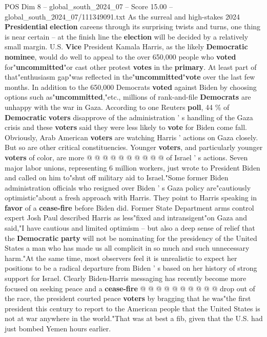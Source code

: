 \begin{textsample}{POS Dim 8 – global\_south\_2024\_07 – Score 15.00 – global\_south\_2024\_07/111349091.txt}  \label{ex:f8_pos_101}
As the surreal and high-stakes 2024 \textbf{Presidential} \textbf{election} careens through its surprising twists and turns, one thing is near certain -- at the finish line the \textbf{election} will be decided by a relatively small margin.
U.S. \textbf{Vice} President Kamala Harris, as the likely \textbf{Democratic} \textbf{nominee}, would do well to appeal to the over 650,000 people who \textbf{voted} for"\textbf{uncommitted}"or cast other protest \textbf{votes} in the \textbf{primary}.
At least part of that"enthusiasm gap"was reflected in the"\textbf{uncommitted}"\textbf{vote} over the last few months.
In addition to the 650,000 Democrats \textbf{voted} against Biden by choosing options such as"\textbf{uncommitted},"etc., millions of rank-and-file \textbf{Democrats} are unhappy with the war in Gaza.
According to one Reuters \textbf{poll}, 44 \% of \textbf{Democratic} \textbf{voters} disapprove of the administration ' s handling of the Gaza crisis and these \textbf{voters} said they were less likely to \textbf{vote} for Biden come fall.
Obviously, Arab American \textbf{voters} are watching Harris ' actions on Gaza closely.
But so are other critical constituencies.
Younger \textbf{voters}, and particularly younger \textbf{voters} of color, are more @ @ @ @ @ @ @ @ @ @ of Israel ' s actions.
Seven major labor unions, representing 6 million workers, just wrote to President Biden and called on him to"shut off military aid to Israel."Some former Biden administration officials who resigned over Biden ' s Gaza policy are"cautiously optimistic"about a fresh approach with Harris.
They point to Harris speaking in \textbf{favor} of a \textbf{cease-fire} before Biden did.
Former State Department arms control expert Josh Paul described Harris as less"fixed and intransigent"on Gaza and said,"I have cautious and limited optimism -- but also a deep sense of relief that the \textbf{Democratic} \textbf{party} will not be nominating for the presidency of the United States a man who has made us all complicit in so much and such unnecessary harm."At the same time, most observers feel it is unrealistic to expect her positions to be a radical departure from Biden ' s based on her history of strong support for Israel.
Clearly Biden-Harris messaging has recently become more focused on seeking peace and a \textbf{cease-fire} @ @ @ @ @ @ @ @ @ @ drop out of the race, the president courted peace \textbf{voters} by bragging that he was"the first president this century to report to the American people that the United States is not at war anywhere in the world."That was at best a fib, given that the U.S. had just bombed Yemen hours earlier.

\end{textsample}

